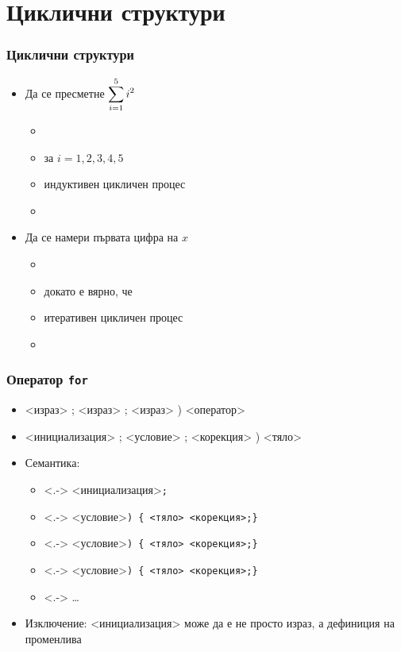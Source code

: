 \documentclass{beamer}
\begin{document}
\section{Циклични структури}

\begin{frame}
  \frametitle{Циклични структури}
  
  \begin{itemize}[<+->]
  \item Да се пресметне $\displaystyle\sum_{i=1}^5\limits i^2$
    \begin{itemize}
    \item {}
    \item {} за $i = 1, 2, 3, 4, 5$
    \item индуктивен цикличен процес
    \item {}
    \end{itemize}
  \item Да се намери първата цифра на $x$
    \begin{itemize}
    \item {}
    \item {} докато е вярно, че 
    \item итеративен цикличен процес
    \item {}
    \end{itemize}
  \end{itemize}
\end{frame}

\begin{frame}
  \frametitle{Оператор \tt{for}}
  
  \begin{itemize}[<+->]
  \item {}<израз> \tta; <израз> \tta; <израз> \tta) <оператор>
  \item {}<инициализация> \tta; <условие> \tta; <корекция> \tta) <тяло>
  \item Семантика:
    \begin{itemize}
    \item<.-> <инициализация>\tt;
    \item<.-> <условие>\tt{) \{} <тяло> <корекция>\tt{;\}}
    \item<.-> <условие>\tt{) \{} <тяло> <корекция>\tt{;\}}
    \item<.-> <условие>\tt{) \{} <тяло> <корекция>\tt{;\}}
    \item<.-> \ldots
    \end{itemize}
  \item \alert{Изключение:} <инициализация> може да е не просто израз, а дефиниция на променлива 
  \end{itemize}
\end{frame}
\end{document}
